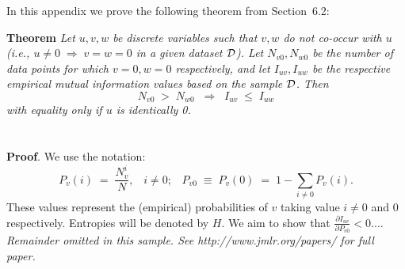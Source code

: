 \documentclass[twoside,11pt]{article}
\newcommand{\dataset}{{\cal D}}
\newcommand{\fracpartial}[2]{\frac{\partial #1}{\partial  #2}}
\begin{document}
In this appendix we prove the following theorem from
Section~6.2:

\noindent
{\bf Theorem} {\it Let $u,v,w$ be discrete variables such that $v, w$ do
not co-occur with $u$ (i.e., $u\neq0\;\Rightarrow \;v=w=0$ in a given
dataset $\dataset$). Let $N_{v0},N_{w0}$ be the number of data points for
which $v=0, w=0$ respectively, and let $I_{uv},I_{uw}$ be the
respective empirical mutual information values based on the sample
$\dataset$. Then
\[
	N_{v0} \;>\; N_{w0}\;\;\Rightarrow\;\;I_{uv} \;\leq\;I_{uw}
\]
with equality only if $u$ is identically 0.} \hfill\BlackBox

\section{}

\noindent
{\bf Proof}. We use the notation:
\[
P_v(i) \;=\;\frac{N_v^i}{N},\;\;\;i \neq 0;\;\;\;
P_{v0}\;\equiv\;P_v(0)\; = \;1 - \sum_{i\neq 0}P_v(i).
\]
These values represent the (empirical) probabilities of $v$
taking value $i\neq 0$ and 0 respectively.  Entropies will be denoted
by $H$. We aim to show that $\fracpartial{I_{uv}}{P_{v0}} < 0$....\\

{\noindent \em Remainder omitted in this sample. See http://www.jmlr.org/papers/ for full paper.}


\vskip 0.2in

\end{document}
